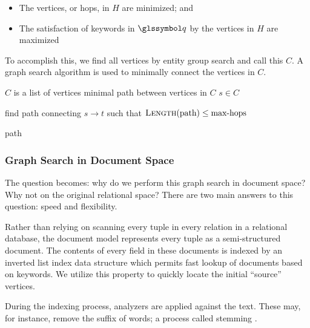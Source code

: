			\begin{itemize}
				\item The vertices, or hops, in \(H\) are minimized; and
				\item The satisfaction of keywords in \(\q\) by the vertices in \(H\) are maximized
			\end{itemize}
			
			To accomplish this, we find all vertices by entity group search and call this \(C\).  A graph search algorithm is used to minimally connect the vertices in \(C\).
			
			\begin{algorithm}[!ht]
				\caption{\(\textsc{Graph-Search}(C)\)}
				\label{alg:graph-search}
				
				\begin{singlespaced}
					\begin{algorithmic}[1]
						\REQUIRE \(C\) is a list of vertices
						\ENSURE minimal path between vertices in \(C\)
						\medskip
						\STATE \(s \in C\)
						
							\STATE find path connecting \(s \rightarrow t\) such that \(\textsc{Length}(\text{path}) \le \text{max-hops}\)
						\ENDFOR
						
						\RETURN path
						\medskip
						\medskip
					\end{algorithmic}
				\end{singlespaced}
			\end{algorithm}
		
		\subsubsection{Graph Search in Document Space}
			The question becomes:  why do we perform this graph search in document space?  Why not on the original relational space?  There are two main answers to this question:  speed and flexibility.
			
			Rather than relying on scanning every tuple in every relation in a relational database, the document model represents every tuple as a semi-structured document.  The contents of every field in these documents is indexed by an inverted list index data structure which permits fast lookup of documents based on keywords.  We utilize this property to quickly locate the initial ``source'' vertices.
			
			During the indexing process, analyzers are applied against the text.  These may, for instance, remove the suffix of words; a process called stemming \cite{porter-97}.
			
